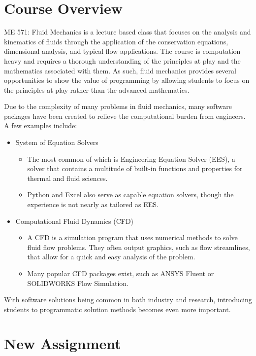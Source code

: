 \section{Course Overview}

ME 571: Fluid Mechanics is a lecture based class that focuses on the analysis
and kinematics of fluids through the application of the conservation equations, dimensional
analysis, and typical flow applications. The course is computation heavy and requires
a thorough understanding of the principles at play and the mathematics associated with them.
As such, fluid mechanics provides several opportunities to show the value of programming by
allowing students to focus on the principles at play rather than the advanced mathematics.

Due to the complexity of many problems in fluid mechanics, many software packages have been
created to relieve the computational burden from engineers. A few examples include:

\begin{itemize}
    \item System of Equation Solvers
    \begin{itemize}
        \item The most common of which is Engineering Equation Solver (EES), a 
        solver that contains a multitude of built-in functions 
        and properties for thermal and fluid sciences.
        \item Python and Excel also serve as capable equation solvers, though
        the experience is not nearly as tailored as EES.
    \end{itemize}
    \item Computational Fluid Dynamics (CFD)
    \begin{itemize}
        \item A CFD is a simulation program that uses numerical methods to solve fluid flow
        problems. They often output graphics, such as flow streamlines, that allow for
        a quick and easy analysis of the problem.
        \item Many popular CFD packages exist, such as ANSYS Fluent or SOLIDWORKS Flow Simulation.
    \end{itemize}
\end{itemize}

With software solutions being common in both industry and research, introducing students to
programmatic solution methods becomes even more important.

\section{New Assignment}

